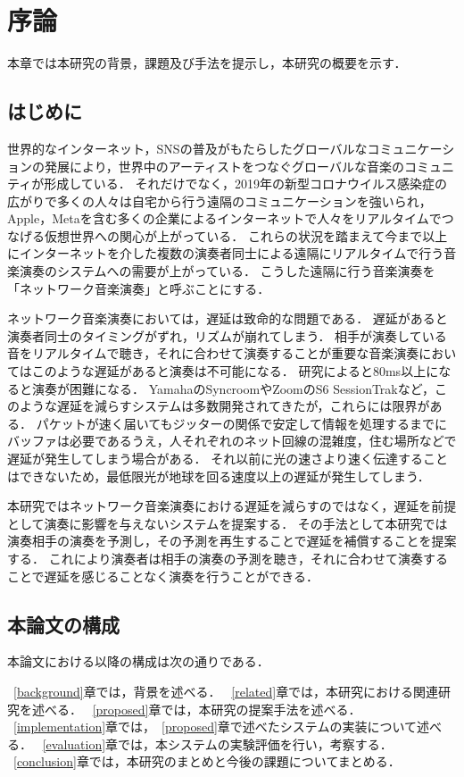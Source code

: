 \chapter{序論}
\label{introduction}

本章では本研究の背景，課題及び手法を提示し，本研究の概要を示す．

\section{はじめに}
\label{introduction:background}

世界的なインターネット，SNSの普及がもたらしたグローバルなコミュニケーションの発展により，世界中のアーティストをつなぐグローバルな音楽のコミュニティが形成している．
それだけでなく，2019年の新型コロナウイルス感染症の広がりで多くの人々は自宅から行う遠隔のコミュニケーションを強いられ，Apple，Metaを含む多くの企業によるインターネットで人々をリアルタイムでつなげる仮想世界への関心が上がっている．
これらの状況を踏まえて今まで以上にインターネットを介した複数の演奏者同士による遠隔にリアルタイムで行う音楽演奏のシステムへの需要が上がっている．
こうした遠隔に行う音楽演奏を「ネットワーク音楽演奏」と呼ぶことにする．

ネットワーク音楽演奏においては，遅延は致命的な問題である．
遅延があると演奏者同士のタイミングがずれ，リズムが崩れてしまう．
相手が演奏している音をリアルタイムで聴き，それに合わせて演奏することが重要な音楽演奏においてはこのような遅延があると演奏は不可能になる．
研究によると80ms以上になると演奏が困難になる．
YamahaのSyncroomやZoomのS6 SessionTrakなど，このような遅延を減らすシステムは多数開発されてきたが，これらには限界がある．
パケットが速く届いてもジッターの関係で安定して情報を処理するまでにバッファは必要であるうえ，人それぞれのネット回線の混雑度，住む場所などで遅延が発生してしまう場合がある．
それ以前に光の速さより速く伝達することはできないため，最低限光が地球を回る速度以上の遅延が発生してしまう．

本研究ではネットワーク音楽演奏における遅延を減らすのではなく，遅延を前提として演奏に影響を与えないシステムを提案する．
その手法として本研究では演奏相手の演奏を予測し，その予測を再生することで遅延を補償することを提案する．
\cite{nmpbook}
\cite{admet}
\cite{admet:experiment}
\cite{alexandraki:2013}
\cite{alexandraki:2014}
\cite{tablanet}
これにより演奏者は相手の演奏の予測を聴き，それに合わせて演奏することで遅延を感じることなく演奏を行うことができる．

\section{本論文の構成}

本論文における以降の構成は次の通りである．

~\ref{background}章では，背景を述べる．
~\ref{related}章では，本研究における関連研究を述べる．
~\ref{proposed}章では，本研究の提案手法を述べる．
~\ref{implementation}章では，~\ref{proposed}章で述べたシステムの実装について述べる．
~\ref{evaluation}章では，本システムの実験評価を行い，考察する．
~\ref{conclusion}章では，本研究のまとめと今後の課題についてまとめる．


